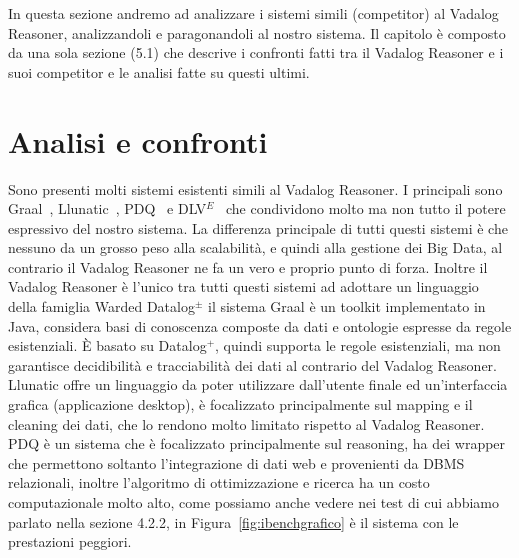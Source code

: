 In questa sezione andremo ad analizzare i sistemi simili (competitor) al Vadalog Reasoner, analizzandoli e paragonandoli al nostro sistema. \newline
Il capitolo è composto da una sola sezione (5.1) che descrive i confronti fatti tra il Vadalog Reasoner e i suoi competitor e le analisi fatte su questi ultimi. \newline

\section{Analisi e confronti}

Sono presenti molti sistemi esistenti simili al Vadalog Reasoner. I principali sono Graal~\cite{baget2015graal}, Llunatic~\cite{geerts2014s}, PDQ~\cite{benedikt2015querying} e DLV$^E$~\cite{leone2012efficiently} che condividono molto ma non tutto il potere espressivo del nostro sistema. \newline
La differenza principale di tutti questi sistemi è che nessuno da un grosso peso alla scalabilità, e quindi alla gestione dei Big Data, al contrario il Vadalog Reasoner ne fa un vero e proprio punto di forza. Inoltre il Vadalog Reasoner è l'unico tra tutti questi sistemi ad adottare un linguaggio della famiglia Warded Datalog$^\pm$\newline \newline
il sistema Graal è un toolkit implementato in Java, considera basi di conoscenza composte da dati e ontologie espresse da regole esistenziali. È basato su Datalog$^+$, quindi supporta le regole esistenziali, ma non garantisce decidibilità e tracciabilità dei dati al contrario del Vadalog Reasoner. \newline \newline
Llunatic offre un linguaggio da poter utilizzare dall'utente finale ed un'interfaccia grafica (applicazione desktop), è focalizzato principalmente sul mapping e il cleaning dei dati, che lo rendono molto limitato rispetto al Vadalog Reasoner. \newline \newline
PDQ è un sistema che è focalizzato principalmente sul reasoning, ha dei wrapper che permettono soltanto l'integrazione di dati web e provenienti da DBMS relazionali, inoltre l'algoritmo di ottimizzazione e ricerca ha un costo computazionale molto alto, come possiamo anche vedere nei test di cui abbiamo parlato nella sezione 4.2.2, in Figura~\ref{fig:ibenchgrafico} è il sistema con le prestazioni peggiori. \newline \newline
